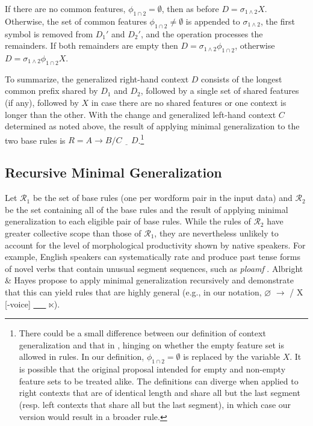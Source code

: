 \documentclass[11pt]{article}
\begin{document}
If there are no common features, $\phi_{1\cap2} = \emptyset$, then as before $D = \sigma_{1\land2}X$. Otherwise, the set of common features $\phi_{1\cap2} \neq \emptyset$ is appended to $\sigma_{1\land2}$, the first symbol is removed from $D_1'$ and $D_2'$, and the operation processes the remainders. If both remainders are empty then $D = \sigma_{1\land2} \phi_{1\cap2}$, otherwise $D = \sigma_{1\land2}\phi_{1\cap2}X$.

To summarize, the generalized right-hand context $D$ consists of the longest common prefix shared by $D_1$ and $D_2$, followed by a single set of shared features (if any), followed by $X$ in case there are no shared features or one context is longer than the other. With the change and generalized left-hand context $C$ determined as noted above, the result of applying minimal generalization to the two base rules is $R = A \to B / C \ \underline{\ \ \ } \ D$.\footnote{There could be a small difference between our definition of context generalization and that in \citet{albright-hayes-2002-modeling}, hinging on whether the empty feature set is allowed in rules. In our definition, $\phi_{1\cap2} = \emptyset$ is replaced by the variable $X$. It is possible that the original proposal intended for empty and non-empty feature sets to be treated alike. The definitions can diverge when applied to right contexts that are of identical length and share all but the last segment (resp. left contexts that share all but the last segment), in which case our version would result in a broader rule.}

\subsection{Recursive Minimal Generalization}

Let $\mathcal{R}_1$ be the set of base rules (one per wordform pair in the input data) and $\mathcal{R}_2$ be the set containing all of the base rules and the result of applying minimal generalization to each eligible pair of base rules. While the rules of $\mathcal{R}_2$ have greater collective scope than those of $\mathcal{R}_1$, they are nevertheless unlikely to account for the level of morphological productivity shown by native speakers. For example, English speakers can systematically rate and produce past tense forms of novel verbs that contain unusual segment sequences, such as \emph{ploamf}  \citep[e.g.,][]{prasada1993}. Albright \& Hayes propose to apply minimal generalization recursively and demonstrate that this can yield rules that are highly general (e.g., in our notation, $\varnothing$ $\to$  / X [-voice] \underline{\ \ \ } $\ltimes$).
\end{document}
